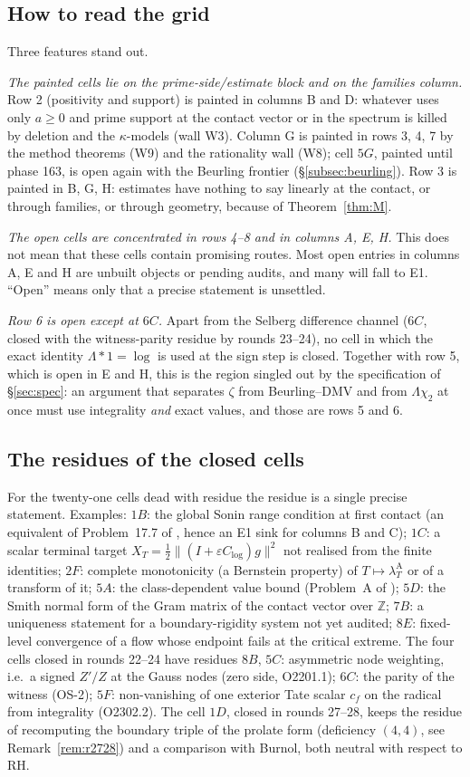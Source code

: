 \documentclass[11pt]{amsart}
\theoremstyle{definition}
\theoremstyle{remark}
\newcommand{\Z}{\mathbb Z}
\newcommand{\lamA}{\lambda^{\mathrm A}_T}
\begin{document}
\subsection{How to read the grid}
Three features stand out.

\emph{The painted cells lie on the prime-side/estimate block and on the families column.} Row 2 (positivity
and support) is painted in columns B and D: whatever uses only $a\ge0$ and prime support at the contact
vector or in the spectrum is killed by deletion and the $\kappa$-models (wall W3). Column G is painted in
rows 3, 4, 7 by the method theorems (W9) and the rationality wall (W8); cell $5G$, painted until phase 163, is open again with the Beurling frontier (\S\ref{subsec:beurling}). Row 3 is painted in B, G, H:
estimates have nothing to say linearly at the contact, or through families, or through geometry,
because of Theorem~\ref{thm:M}.

\emph{The open cells are concentrated in rows 4--8 and in columns A, E, H.} This does not mean that these
cells contain promising routes. Most open entries in columns A, E and H are unbuilt objects or pending
audits, and many will fall to E1. ``Open'' means only that a precise statement is unsettled.

\emph{Row 6 is open except at $6C$.} Apart from the Selberg difference channel ($6C$, closed with the
witness-parity residue by rounds 23--24), no cell in which the exact identity $\Lambda*1=\log$ is used at
the sign step is closed. Together with row 5, which is open in E and H, this is the region singled out by the
specification of \S\ref{sec:spec}: an argument that separates $\zeta$ from Beurling--DMV and from $\Lambda\chi_2$
at once must use integrality \emph{and} exact values, and those are rows 5 and 6.

\subsection{The residues of the closed cells}
For the twenty-one cells dead with residue the residue is a single precise statement. Examples:
$1B$: the global Sonin range condition at first contact (an equivalent of Problem~17.7 of
\cite{Paper47}, hence an E1 sink for columns B and C); $1C$: a scalar terminal target
$X_T=\frac12\|(I+\varepsilon C_{\log})g\|^2$ not realised from the finite identities; $2F$: complete
monotonicity (a Bernstein property) of $T\mapsto\lamA$ or of a transform of it; $5A$: the class-dependent
value bound (Problem~A of \cite{Paper47}); $5D$: the Smith normal form of the Gram matrix of the contact
vector over $\Z$; $7B$: a uniqueness statement for a boundary-rigidity system not yet audited;
$8E$: fixed-level convergence of a flow whose endpoint fails at the critical extreme. The four cells
closed in rounds 22--24 have residues $8B$, $5C$: asymmetric node weighting, i.e.\ a signed $Z'/Z$ at the
Gauss nodes (zero side, O2201.1); $6C$: the parity of the witness (OS-2); $5F$: non-vanishing of one
exterior Tate scalar $c_f$ on the radical from integrality (O2302.2). The cell $1D$, closed in rounds 27--28, keeps the residue of recomputing the boundary triple of the prolate form (deficiency $(4,4)$, see Remark~\ref{rem:r2728}) and a comparison with Burnol, both neutral with respect to RH.
\end{document}
